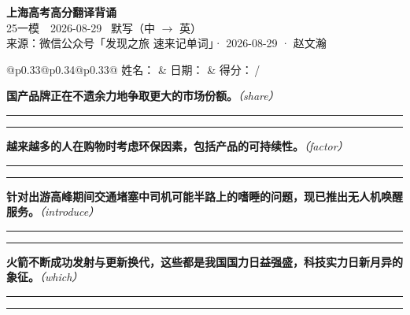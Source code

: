 \documentclass[11pt,a4paper]{article}
\newcommand{\num}[1]{\makebox[1.9em][r]{#1.}\hspace{0.3em}}
\newcommand{\wline}{\noindent\rule{\linewidth}{0.4pt}}
\newcommand{\prompt}[1]{\emph{\textcolor{tipblue}{\small（#1）}}}
\begin{document}
\pagestyle{plain}
\begin{center}
{\LARGE\bfseries 上海高考高分翻译背诵 }\\[0.25em]
{\large 25一模　2026-08-29 \quad\ 默写（中 $\to$ 英）}\\[0.35em]
{\footnotesize 来源：微信公众号「发现之旅 速来记单词」· 2026-08-29 · 赵文瀚}
\end{center}

\vspace{0.4em}
\noindent\begin{tabular}{@{}p{0.33\textwidth}@{}p{0.34\textwidth}@{}p{0.33\textwidth}@{}}
姓名：\underline{\hspace{2.0cm}} & 日期：\underline{\hspace{2.0cm}} & 得分：\underline{\hspace{1.4cm}}\,/ \\
\end{tabular}

\vspace{0.5em}

\vspace{0.8em}
\num{1}\textbf{国产品牌正在不遗余力地争取更大的市场份额。}\prompt{share}

\vspace{0.3em}

\wline\vspace{0.3em}
\wline

\num{2}\textbf{越来越多的人在购物时考虑环保因素，包括产品的可持续性。}\prompt{factor}

\vspace{0.3em}

\wline\vspace{0.3em}
\wline

\num{3}\textbf{针对出游高峰期间交通堵塞中司机可能半路上的嗜睡的问题，现已推出无人机唤醒服务。}\prompt{introduce}

\vspace{0.3em}

\wline\vspace{0.3em}
\wline

\num{4}\textbf{火箭不断成功发射与更新换代，这些都是我国国力日益强盛，科技实力日新月异的象征。}\prompt{which}

\vspace{0.3em}

\wline\vspace{0.3em}
\wline
\end{document}
